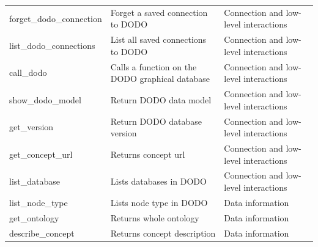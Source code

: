 \documentclass[9pt,a4paper,]{extarticle}
\begin{document}
\begin{table}
{\begin{tabular}[t]{lll}
\addlinespace
forget\_dodo\_connection & Forget a saved connection to DODO & Connection and low-level interactions\\
\rowcolor{gray!6}  list\_dodo\_connections & List all saved connections to DODO & Connection and low-level interactions\\
call\_dodo & Calls a function on the DODO graphical database & Connection and low-level interactions\\
\rowcolor{gray!6}  show\_dodo\_model & Return DODO data model & Connection and low-level interactions\\
get\_version & Return DODO database version & Connection and low-level interactions\\
\addlinespace
\rowcolor{gray!6}  get\_concept\_url & Returns concept url & Connection and low-level interactions\\
list\_database & Lists databases in DODO & Connection and low-level interactions\\
\rowcolor{gray!6}  list\_node\_type & Lists node type in DODO & Data information\\
get\_ontology & Returns whole ontology & Data information\\
\rowcolor{gray!6}  describe\_concept & Returns concept description & Data information\\
\bottomrule
\end{tabular}}
\end{table}
\end{document}

